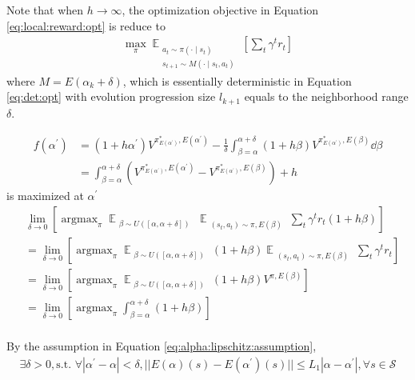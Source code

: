 
Note that when $h\rightarrow\infty$, the optimization objective in Equation \eqref{eq:local:reward:opt} is reduce to
\begin{equation} \label{eq:local:reward:opt:infty}
\begin{split}
    \max_{\pi}
    \mathop{\mathbb{E}}_{ 
    \substack{
    a_t \sim \pi(\cdot \mid s_t) \\ 
    s_{t+1} \sim M(\cdot \mid s_t, a_t)
    }}
    [\sum_{t} \gamma^t r_t]
\end{split}
\end{equation}
where $M = E(\alpha_k + \delta)$,
which is essentially deterministic in Equation \eqref{eq:det:opt} with evolution progression size $l_{k+1}$ equals to the neighborhood range $\delta$.


\begin{equation}
\begin{split}
    f(\alpha^\prime) & = (1+h\alpha^\prime)V^{\pi^*_{E(\alpha^\prime)},E(\alpha^\prime)}- \frac{1}{\delta} \int_{\beta=\alpha}^{\alpha+\delta} (1 + h \beta)
    V^{\pi^*_{E(\alpha^\prime)},E(\beta)}  \dd{\beta} \\
    & = \int_{\beta=\alpha}^{\alpha+\delta} (V^{\pi^*_{E(\alpha^\prime)},E(\alpha^\prime)} - V^{\pi^*_{E(\alpha^\prime)},E(\beta)} ) + h 
\end{split}
\end{equation}
is maximized at $\alpha^\prime$
\begin{equation}
\begin{split}
    & \lim_{\delta \rightarrow 0}
    \left[
    \mathop{\arg\max}_{\pi}
    \mathop{\mathbb{E}}_{ 
    \substack{
    \beta \sim U([\alpha, \alpha+\delta])
    }}
    \mathop{\mathbb{E}}_{ 
    \substack{(s_t, a_t) \sim \pi, E(\beta)
    }}
    \sum_{t} \gamma^t r_t (1 + h \beta)
    \right] \\
    & = \lim_{\delta \rightarrow 0}
    \left[
    \mathop{\arg\max}_{\pi}
    \mathop{\mathbb{E}}_{ 
    \substack{
    \beta \sim U([\alpha, \alpha+\delta])
    }}
    (1 + h \beta)
    \mathop{\mathbb{E}}_{ 
    \substack{(s_t, a_t) \sim \pi, E(\beta)
    }}
    \sum_{t} \gamma^t r_t 
    \right] \\
    & = \lim_{\delta \rightarrow 0}
    \left[
    \mathop{\arg\max}_{\pi}
    \mathop{\mathbb{E}}_{ 
    \substack{
    \beta \sim U([\alpha, \alpha+\delta])
    }}
    (1 + h \beta) V^{\pi, E(\beta)} 
    \right] \\
    & = \lim_{\delta \rightarrow 0}
    \left[
    \mathop{\arg\max}_{\pi}
    \int_{\beta=\alpha}^{\alpha+\delta} (1+h\beta)
    \right] \\
\end{split}
\end{equation}
    
    
    
    By the assumption in Equation \ref{eq:alpha:lipschitz:assumption},
\begin{equation}
\begin{split}
  \exists \delta > 0, \text{s.t. } \forall |\alpha^\prime - \alpha | < \delta, 
 ||E(\alpha)(s) - E(\alpha^\prime)(s)|| \le L_1 |\alpha - \alpha^\prime|,
 \forall s\in\mathcal{S} 
\end{split}
\end{equation}